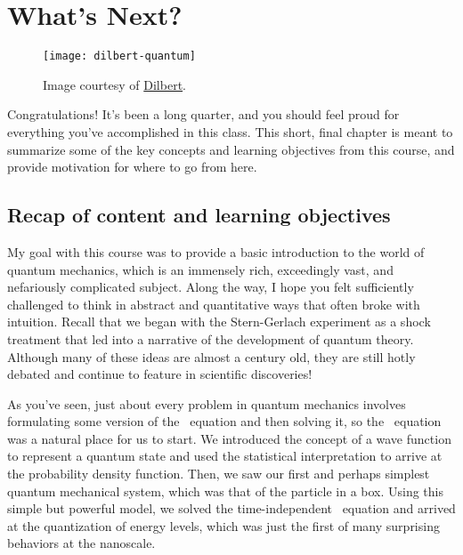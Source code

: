 %

%

\chapter{What's Next?} \label{ch:next}
\begin{figure}[!h]
	\centering
	\texttt{[image: dilbert-quantum]}
	\caption{Image courtesy of \href{http://dilbert.com/strip/2012-04-17}{Dilbert}.}
\end{figure}
Congratulations! It's been a long quarter, and you should feel proud for everything you've accomplished in this class. This short, final chapter is meant to summarize some of the key concepts and learning objectives from this course, and provide motivation for where to go from here. 

\section[Recap]{Recap of content and learning objectives}
My goal with this course was to provide a basic introduction to the world of quantum mechanics, which is an immensely rich, exceedingly vast, and nefariously complicated subject. Along the way, I hope you felt sufficiently challenged to think in abstract and quantitative ways that often broke with intuition. Recall that we began with the Stern-Gerlach experiment as a shock treatment that led into a narrative of the development of quantum theory. Although many of these ideas are almost a century old, they are still hotly debated and continue to feature in scientific discoveries! \par 

As you've seen, just about every problem in quantum mechanics involves formulating some version of the \Sch\ equation and then solving it, so the \Sch\ equation was a natural place for us to start. We introduced the concept of a wave function to represent a quantum state and used the statistical interpretation to arrive at the probability density function. Then, we saw our first and perhaps simplest quantum mechanical system, which was that of the particle in a box. Using this simple but powerful model, we solved the time-independent \Sch\ equation and arrived at the quantization of energy levels, which was just the first of many surprising behaviors at the nanoscale. \par 

